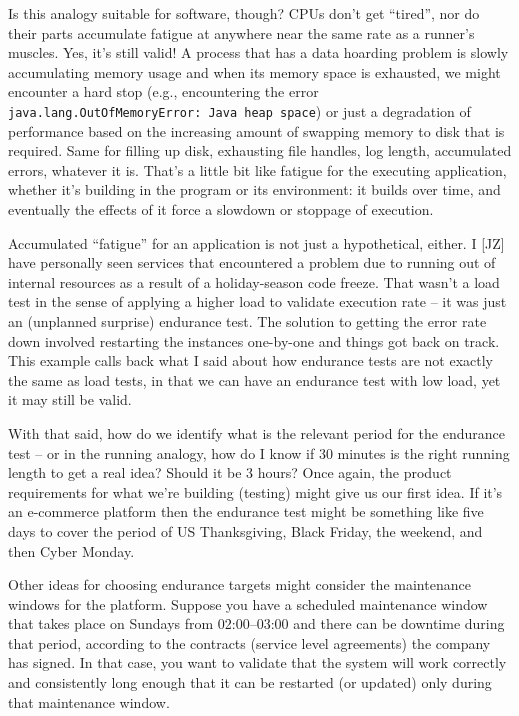 Is this analogy suitable for software, though? CPUs don't get ``tired'', nor do their parts accumulate fatigue at anywhere near the same rate as a runner's muscles. Yes, it's still valid! A process that has a data hoarding problem is slowly accumulating memory usage and when its memory space is exhausted, we might encounter a hard stop (e.g., encountering the error \texttt{java.lang.OutOfMemoryError: Java heap space}) or just a degradation of performance based on the increasing amount of swapping memory to disk that is required. Same for filling up disk, exhausting file handles, log length, accumulated errors, whatever it is. That's a little bit like fatigue for the executing application, whether it's building in the program or its environment: it builds over time, and eventually the effects of it force a slowdown or stoppage of execution. 

Accumulated ``fatigue'' for an application is not just a hypothetical, either. I [JZ] have personally seen services that encountered a problem due to running out of internal resources as a result of a holiday-season code freeze. That wasn't a load test in the sense of applying a higher load to validate execution rate -- it was just an (unplanned surprise) endurance test. The solution to getting the error rate down involved restarting the instances one-by-one and things got back on track. This example calls back what I said about how endurance tests are not exactly the same as load tests, in that we can have an endurance test with low load, yet it may still be valid.

With that said, how do we identify what is the relevant period for the endurance test -- or in the running analogy, how do I know if 30 minutes is the right running length to get a real idea? Should it be 3 hours? Once again, the product requirements for what we're building (testing) might give us our first idea. If it's an e-commerce platform then the endurance test might be something like five days to cover the period of US Thanksgiving, Black Friday, the weekend, and then Cyber Monday. 

Other ideas for choosing endurance targets might consider the maintenance windows for the platform. Suppose you have a scheduled maintenance window that takes place on Sundays from 02:00--03:00 and there can be downtime during that period, according to the contracts (service level agreements) the company has signed. In that case, you want to validate that the system will work correctly and consistently long enough that it can be restarted (or updated) only during that maintenance window. 

